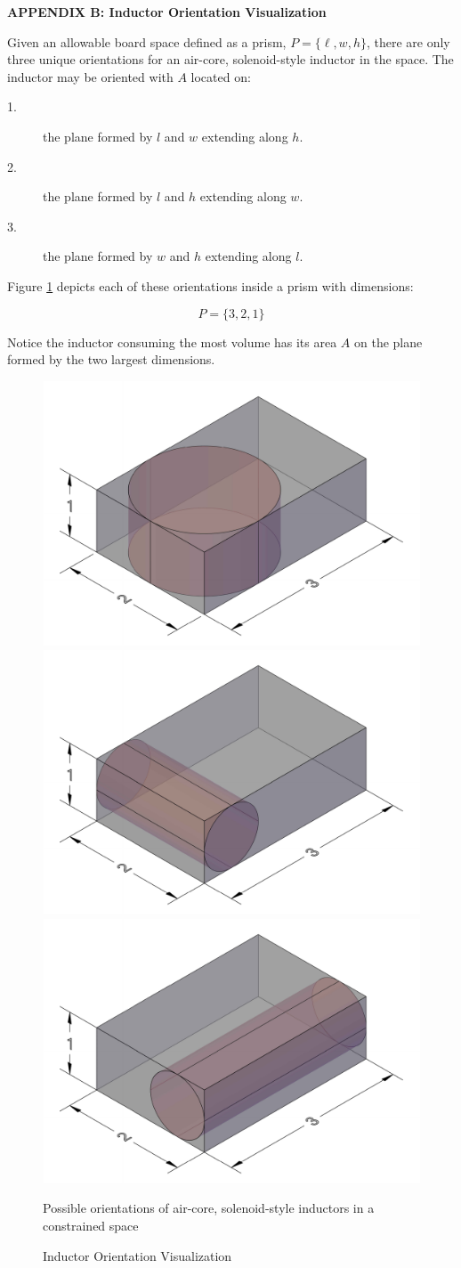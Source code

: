 \centerline{\large\bf APPENDIX B: Inductor Orientation Visualization}\label{appendix:orientation-visualization}
Given an allowable board space defined as a prism, $P = \{\ell, w, h\}$, there are only three unique orientations for an air-core, solenoid-style inductor in the space. The inductor may be oriented with $A$ located on:
\begin{description}
\item[1.] the plane formed by $l$ and $w$ extending along $h$.
\item[2.] the plane formed by $l$ and $h$ extending along $w$.
\item[3.] the plane formed by $w$ and $h$ extending along $l$.
\end{description}

Figure \ref{fig:PossibleOrientations} depicts each of these orientations inside a prism with dimensions:

\begin{equation}\label{eq:PrismSimulation}
P = \{3, 2, 1\} \nonumber
\end{equation}

Notice the inductor consuming the most volume has its area $A$ on the plane formed by the two largest dimensions.

\begin{figure}[!htbp]
    \centering
    \includegraphics[width=0.30\linewidth]{img/xyInductorCropped.pdf}
    \includegraphics[width=0.30\linewidth]{img/xzInductorCropped.pdf}
    \includegraphics[width=0.30\linewidth]{img/yzInductorCropped.pdf}
    \caption{Inductor Orientation Visualization}Possible orientations of air-core, solenoid-style inductors in a constrained space
    \label{fig:PossibleOrientations}
\end{figure}